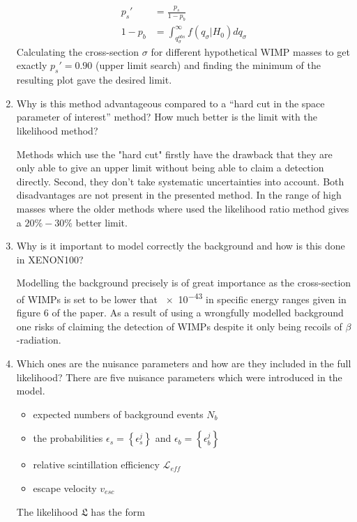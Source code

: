 \documentclass[10pt]{article}
\newenvironment{myfont}{\fontfamily{put}\selectfont}{\par}
\newcommand{\likelihood}{\mathfrak{L}}
\begin{document}
\begin{myfont}
\begin{enumerate}[label = \textbf{\roman*}.]
  \begin{align}
      p_s' &= \frac{p_s}{1-p_b} \\
      1 - p_b  &= \int^\infty_{q^{obs}_{\sigma}} f(q_{\sigma}|H_{0})  dq_{\sigma}
  \end{align}
  Calculating the cross-section $\sigma$ for different hypothetical WIMP masses to get exactly $p_s'=0.90$ (upper limit search) and finding the minimum of the resulting plot gave the desired limit.

  \item Why is this method advantageous compared to a “hard cut in the space parameter of interest” method?  How much better is the limit with the likelihood method?
  \noindent

  Methods which use the "hard cut" firstly have the drawback that they are only able to give an upper limit without being able to claim a detection directly. Second, they don't take systematic uncertainties into account. Both disadvantages are not present in the presented method. In the range of high masses where the older methods where used the likelihood ratio method gives a $20\% - 30\%$ better limit.

  \item Why is it important to model correctly the background and how is this done in XENON100?
  \noindent

  Modelling the background precisely is of great importance as the cross-section of WIMPs is set to be lower that \num{e-43} in specific energy ranges given in figure 6 of the paper.
  As a result of using a wrongfully modelled background one risks of claiming the detection of WIMPs despite it only being recoils of $\beta$-radiation.

  \item Which  ones  are  the  nuisance  parameters  and  how  are  they  included  in  the  full likelihood?
  \noindent
  There are five nuisance parameters which were introduced in the model.
  \begin{itemize}
      \item expected numbers of background events $N_b$
      \item the probabilities $\epsilon_s = \left\{ \epsilon^j_s\right\}$ and $\epsilon_b = \left\{ \epsilon^j_b\right\}$
      \item relative scintillation efficiency $\mathcal{L}_{eff}$
      \item escape velocity $v_{esc}$
  \end{itemize}
  The likelihood $\likelihood$ has the form


\end{enumerate}
\end{myfont}
\end{document}
